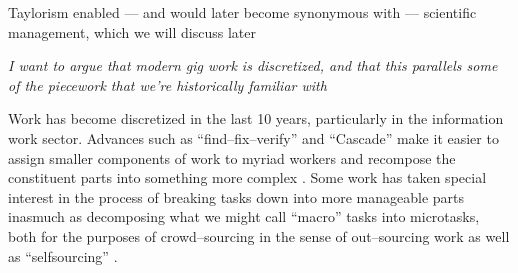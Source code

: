 \documentclass{sigchi}
\begin{document}
Taylorism enabled
--- and would later become synonymous with --- 
scientific management, which we will discuss later











\textit{I want to argue that modern gig work is discretized,
and that this parallels some of the piecework that we're historically familiar with}

Work has become discretized in the last 10 years, particularly in the information work sector.
Advances such as
``find--fix--verify'' %
and
``Cascade'' %
make it easier to assign smaller components of work to myriad workers and
recompose the constituent parts into something more complex
\cite{bernstein2015soylent,chilton2013cascade}.
Some work has taken special interest in the process of breaking tasks down into more manageable parts
inasmuch as decomposing what we might call ``macro'' tasks into microtasks,
both for the purposes of crowd--sourcing in the sense of out--sourcing work
as well as ``selfsourcing''
\cite{cheng2015break,teevan2014selfsourcing}.
\end{document}
